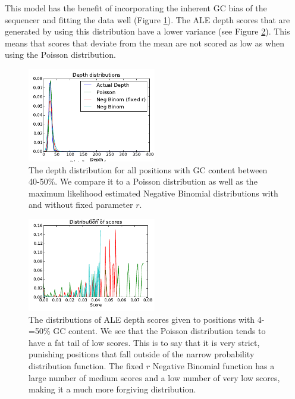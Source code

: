 \documentclass[phd,tocprelim]{cornell}
\begin{document}
This model has the benefit of incorporating the inherent GC bias of the sequencer and fitting the data well (Figure \ref{fig:GC4}). The ALE depth scores that are generated by using this distribution have a lower variance (see Figure \ref{fig:GC5}). This means that scores that deviate from the mean are not scored as low as when using the Poisson distribution.

\begin{figure}[hptb]
    \centerline{\includegraphics[width=0.5\textwidth]{figures/ALE/GC_depth_distributions.png}}
    \caption[Various distributions fit to GC content]{The depth distribution for all positions with GC content between 40-50\%. We compare it to a Poisson distribution as well as the maximum likelihood estimated Negative Binomial distributions with and without fixed parameter $r$.}\label{fig:GC4}
\end{figure}

\begin{figure}[hptb]
    \centerline{\includegraphics[width=0.5\textwidth]{figures/ALE/GC_depth_distribution_of_scores.png}}
    \caption[Distribution of scores using various distributions]{The distributions of ALE depth scores given to positions with 4-=50\% GC content. We see that the Poisson distribution tends to have a fat tail of low scores. This is to say that it is very strict, punishing positions that fall outside of the narrow probability distribution function. The fixed $r$ Negative Binomial function has a large number of medium scores and a low number of very low scores, making it a much more forgiving distribution.}\label{fig:GC5}
\end{figure}
\end{document}
